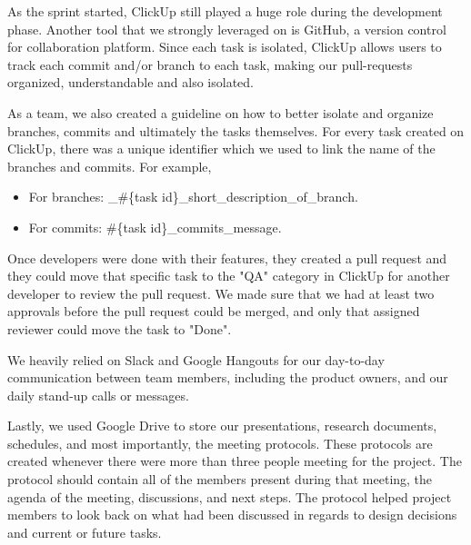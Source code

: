 As the sprint started, ClickUp still played a huge role during the development phase. Another tool that we strongly leveraged on is GitHub, a version control for collaboration platform. Since each task is isolated, ClickUp allows users to track each commit and/or branch to each task, making our pull-requests organized, understandable and also isolated.

As a team, we also created a guideline on how to better isolate and organize branches, commits and ultimately the tasks themselves. For every task created on ClickUp, there was a unique identifier which we used to link the name of the branches and commits. For example,

\begin{itemize}
\item For branches: \_\#\{task id\}\_short\_description\_of\_branch.
\item For commits: \#\{task id\}\_commits\_message.
\end{itemize}


Once developers were done with their features, they created a pull request and they could move that specific task to the "QA" category in ClickUp for another developer to review the pull request. We made sure that we had at least two approvals before the pull request could be merged, and only that assigned reviewer could move the task to "Done".

We heavily relied on Slack and Google Hangouts for our day-to-day communication between team members, including the product owners, and our daily stand-up calls or messages.

Lastly, we used Google Drive to store our presentations, research documents, schedules, and most importantly, the meeting protocols. These protocols are created whenever there were more than three people meeting for the project. The protocol should contain all of the members present during that meeting, the agenda of the meeting, discussions, and next steps. The protocol helped project members to look back on what had been discussed in regards to design decisions and current or future tasks.


\newpage
